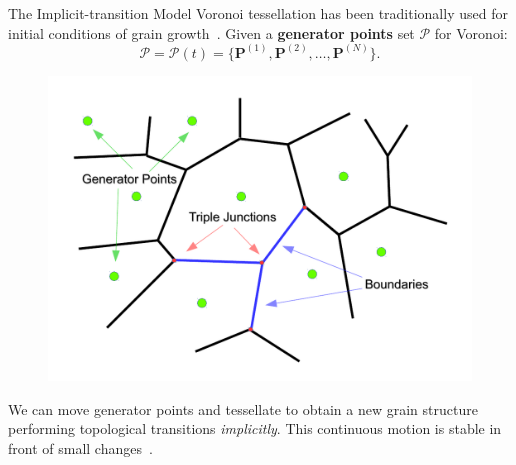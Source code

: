 \documentclass[usenames,dvipsnames]{beamer}
\begin{document}
\begin{frame}{The Implicit-transition Model}
    Voronoi tessellation has been traditionally used for initial conditions of grain growth~\cite{Barmak2013,BarralesMora2008,Kinderlehrer2006,Lazar2011,Syha2010,torres2015}. Given a \textbf{generator points} set $\mathcal{P}$ for Voronoi:
    \begin{equation*}
    \mathcal{P} = \mathcal{P}(t) = \{ \mathbf{P}^{(1)}, \mathbf{P}^{(2)}, \dotsc, \mathbf{P}^{(N)} \}.
    \end{equation*}
    \vspace{-1em}
    \begin{figure}
        \centering
        \includegraphics[trim={0 3em 0 2em},clip=true,scale=0.37]{figures/extras/2dschemewithcenters.pdf}
    \end{figure}
    \vspace{-0.5em}
    We can move generator points and tessellate to obtain a new grain structure performing topological transitions \emph{implicitly}. This continuous motion is stable in front of small changes~\cite{reem2011geometric}.
\end{frame}
\end{document}
